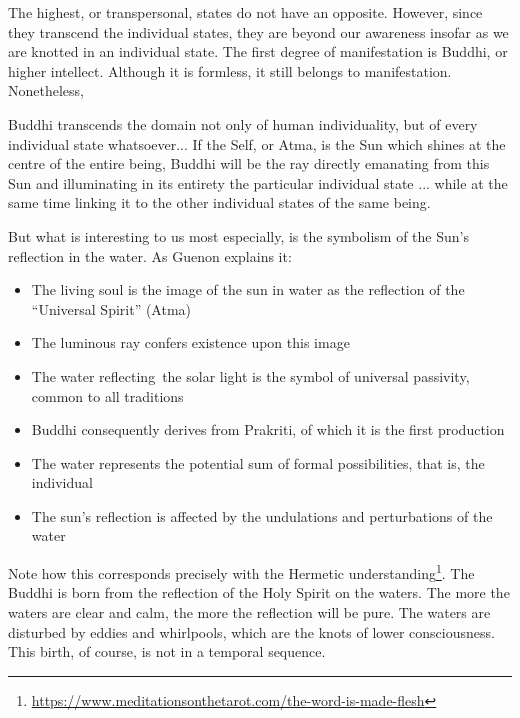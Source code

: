 The highest, or transpersonal, states do not have an opposite. However, since they transcend the individual states, they are beyond our awareness insofar as we are knotted in an individual state. The first degree of manifestation is Buddhi, or higher intellect. Although it is formless, it still belongs to manifestation. Nonetheless,

\begin{quotex}
Buddhi transcends the domain not only of human individuality, but of every individual state whatsoever... If the Self, or Atma, is the Sun which shines at the centre of the entire being, Buddhi will be the ray directly emanating from this Sun and illuminating in its entirety the particular individual state ... while at the same time linking it to the other individual states of the same being.
\end{quotex}


But what is interesting to us most especially, is the symbolism of the Sun's reflection in the water. As Guenon explains it:

\begin{itemize}


\item The living soul is the image of the sun in water as the reflection of the ``Universal Spirit'' (Atma)

\item The luminous ray confers existence upon this image

\item The water reflecting~the solar light is the symbol of universal passivity, common to all traditions

\item Buddhi consequently derives from Prakriti, of which it is the first production

\item The water represents the potential sum of formal possibilities, that is, the individual

\item The sun's reflection is affected by the undulations and perturbations of the water
\end{itemize}


Note how this corresponds precisely with the Hermetic understanding\footnote{\url{https://www.meditationsonthetarot.com/the-word-is-made-flesh}}. The Buddhi is born from the reflection of the Holy Spirit on the waters. The more the waters are clear and calm, the more the reflection will be pure. The waters are disturbed by eddies and whirlpools, which are the knots of lower consciousness. This birth, of course, is not in a temporal sequence.

